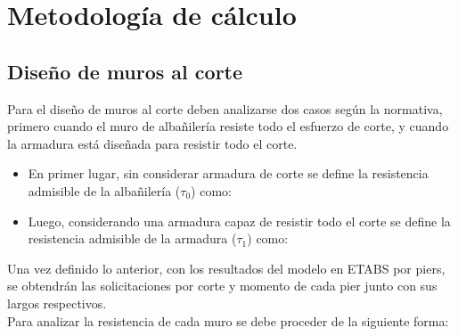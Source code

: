 \newpage
\section{Metodología de cálculo}

\subsection{Diseño de muros al corte}
Para el diseño de muros al corte deben analizarse dos casos según la normativa, primero cuando el muro de albañilería resiste todo el esfuerzo de corte, y cuando la armadura está diseñada para resistir todo el corte.

\begin{itemize}
    \item En primer lugar, sin considerar armadura de corte se define la resistencia admisible de la albañilería ($\tau_0$)  como:
    
    \item Luego, considerando una armadura capaz de resistir todo el corte se define la resistencia admisible de la armadura ($\tau_1$)  como:
    
\end{itemize}

Una vez definido lo anterior, con los resultados del modelo en ETABS por piers, se obtendrán las solicitaciones por corte y momento de cada pier junto con sus largos respectivos.\\

Para analizar la resistencia de cada muro se debe proceder de la siguiente forma:


